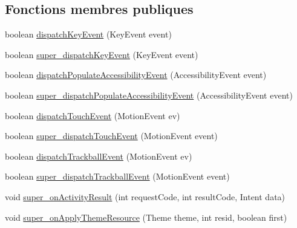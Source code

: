 \subsection*{Fonctions membres publiques}
\begin{DoxyCompactItemize}
\item 
boolean \hyperlink{classorg_1_1qtproject_1_1qt5_1_1android_1_1bindings_1_1_qt_activity_a3419f10b60670ae0fd0a222fcd684273}{dispatch\-Key\-Event} (Key\-Event event)
\item 
boolean \hyperlink{classorg_1_1qtproject_1_1qt5_1_1android_1_1bindings_1_1_qt_activity_a0222dd1edd412d5573914d8e563d8dfc}{super\-\_\-dispatch\-Key\-Event} (Key\-Event event)
\item 
boolean \hyperlink{classorg_1_1qtproject_1_1qt5_1_1android_1_1bindings_1_1_qt_activity_a7eacf9d228567bace814d7d90cc88dc1}{dispatch\-Populate\-Accessibility\-Event} (Accessibility\-Event event)
\item 
boolean \hyperlink{classorg_1_1qtproject_1_1qt5_1_1android_1_1bindings_1_1_qt_activity_a174082c8c4aa301a2a8c78ce237bca22}{super\-\_\-dispatch\-Populate\-Accessibility\-Event} (Accessibility\-Event event)
\item 
boolean \hyperlink{classorg_1_1qtproject_1_1qt5_1_1android_1_1bindings_1_1_qt_activity_a080d702cac33de4a97b4645567cf8c04}{dispatch\-Touch\-Event} (Motion\-Event ev)
\item 
boolean \hyperlink{classorg_1_1qtproject_1_1qt5_1_1android_1_1bindings_1_1_qt_activity_a8525630fd66e1d88e94f7bc9457bbd1b}{super\-\_\-dispatch\-Touch\-Event} (Motion\-Event event)
\item 
boolean \hyperlink{classorg_1_1qtproject_1_1qt5_1_1android_1_1bindings_1_1_qt_activity_ad305b6d78907e6fc4bc4fa9b77256a22}{dispatch\-Trackball\-Event} (Motion\-Event ev)
\item 
boolean \hyperlink{classorg_1_1qtproject_1_1qt5_1_1android_1_1bindings_1_1_qt_activity_a84a82b3eb7dd352d126c55272c64264a}{super\-\_\-dispatch\-Trackball\-Event} (Motion\-Event event)
\item 
void \hyperlink{classorg_1_1qtproject_1_1qt5_1_1android_1_1bindings_1_1_qt_activity_a03bf6f3f50c07592cbee97ce9ebdb315}{super\-\_\-on\-Activity\-Result} (int request\-Code, int result\-Code, Intent data)
\item 
void \hyperlink{classorg_1_1qtproject_1_1qt5_1_1android_1_1bindings_1_1_qt_activity_a03b4db053b9528617c37bab2d47fc803}{super\-\_\-on\-Apply\-Theme\-Resource} (Theme theme, int resid, boolean first)
\item 

\end{DoxyCompactItemize}
